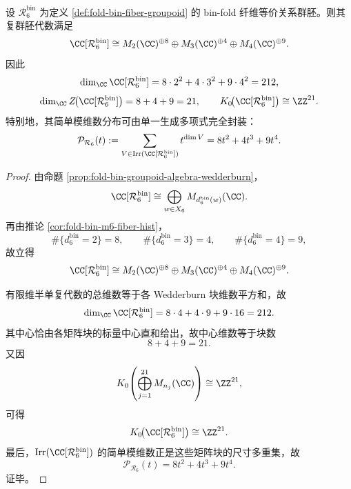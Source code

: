 \begin{theorem}\label{thm:xi-time-part9zf-window6-groupoid-wedderburn-closedform}
设 \(\mathcal R_6^{\mathrm{bin}}\) 为定义 \ref{def:fold-bin-fiber-groupoid} 的 bin-fold 纤维等价关系群胚。则其复群胚代数满足
\[
\CC[\mathcal R_6^{\mathrm{bin}}]
\cong
M_2(\CC)^{\oplus 8}\oplus M_3(\CC)^{\oplus 4}\oplus M_4(\CC)^{\oplus 9}.
\]
因此
\[
\dim_{\CC}\CC[\mathcal R_6^{\mathrm{bin}}]
=
8\cdot 2^2+4\cdot 3^2+9\cdot 4^2
=212,
\]
\[
\dim_{\CC}Z\!\bigl(\CC[\mathcal R_6^{\mathrm{bin}}]\bigr)=8+4+9=21,
\qquad
K_0\!\bigl(\CC[\mathcal R_6^{\mathrm{bin}}]\bigr)\cong \ZZ^{21}.
\]
特别地，其简单模维数分布可由单一生成多项式完全封装：
\[
\mathcal P_{\mathcal R_6}(t):=
\sum_{V\in\operatorname{Irr}(\CC[\mathcal R_6^{\mathrm{bin}}])}t^{\dim V}
=8t^2+4t^3+9t^4.
\]
\end{theorem}
\begin{proof}
由命题 \ref{prop:fold-bin-groupoid-algebra-wedderburn}，
\[
\CC[\mathcal R_6^{\mathrm{bin}}]
\cong
\bigoplus_{w\in X_6}M_{d_6^{\mathrm{bin}}(w)}(\CC).
\]
再由推论 \ref{cor:fold-bin-m6-fiber-hist}，
\[
\#\{d_6^{\mathrm{bin}}=2\}=8,\qquad
\#\{d_6^{\mathrm{bin}}=3\}=4,\qquad
\#\{d_6^{\mathrm{bin}}=4\}=9,
\]
故立得
\[
\CC[\mathcal R_6^{\mathrm{bin}}]
\cong
M_2(\CC)^{\oplus 8}\oplus M_3(\CC)^{\oplus 4}\oplus M_4(\CC)^{\oplus 9}.
\]

有限维半单复代数的总维数等于各 Wedderburn 块维数平方和，故
\[
\dim_{\CC}\CC[\mathcal R_6^{\mathrm{bin}}]
=8\cdot 4+4\cdot 9+9\cdot 16
=212.
\]
其中心恰由各矩阵块的标量中心直和给出，故中心维数等于块数
\[
8+4+9=21.
\]
又因
\[
K_0\!\left(\bigoplus_{j=1}^{21}M_{n_j}(\CC)\right)\cong \ZZ^{21},
\]
可得
\[
K_0\!\bigl(\CC[\mathcal R_6^{\mathrm{bin}}]\bigr)\cong \ZZ^{21}.
\]
最后，\(\operatorname{Irr}(\CC[\mathcal R_6^{\mathrm{bin}}])\) 的简单模维数正是这些矩阵块的尺寸多重集，故
\[
\mathcal P_{\mathcal R_6}(t)=8t^2+4t^3+9t^4.
\]
证毕。
\end{proof}

